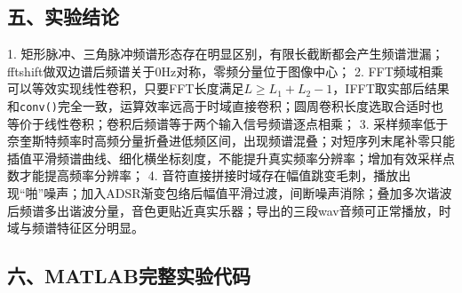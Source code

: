 \subsection{五、实验结论}
1. 矩形脉冲、三角脉冲频谱形态存在明显区别，有限长截断都会产生频谱泄漏；fftshift做双边谱后频谱关于0Hz对称，零频分量位于图像中心；
2. FFT频域相乘可以等效实现线性卷积，只要FFT长度满足$L\ge L_1+L_2-1$，IFFT取实部后结果和\texttt{conv()}完全一致，运算效率远高于时域直接卷积；圆周卷积长度选取合适时也等价于线性卷积；卷积后频谱等于两个输入信号频谱逐点相乘；
3. 采样频率低于奈奎斯特频率时高频分量折叠进低频区间，出现频谱混叠；对短序列末尾补零只能插值平滑频谱曲线、细化横坐标刻度，不能提升真实频率分辨率；增加有效采样点数才能提高频率分辨率；
4. 音符直接拼接时域存在幅值跳变毛刺，播放出现“啪”噪声；加入ADSR渐变包络后幅值平滑过渡，间断噪声消除；叠加多次谐波后频谱多出谐波分量，音色更贴近真实乐器；导出的三段wav音频可正常播放，时域与频谱特征区分明显。

\subsection{六、MATLAB完整实验代码}
